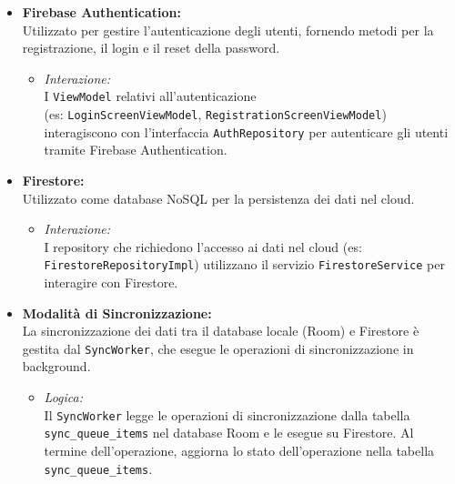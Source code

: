 \documentclass{article}
\begin{document}
\begin{itemize}
  \item \textbf{Firebase Authentication:}\\
    Utilizzato per gestire l'autenticazione degli utenti, fornendo metodi per la
    registrazione, il login e il reset della password.
    \begin{itemize}
      \item \textit{Interazione:}\\
        I \texttt{ViewModel} relativi all'autenticazione \\(es:
        \texttt{LoginScreenViewModel}, \texttt{RegistrationScreenViewModel})
        interagiscono con l'interfaccia \texttt{AuthRepository} per autenticare
        gli utenti tramite Firebase Authentication.
    \end{itemize}

  \item \textbf{Firestore:}\\
    Utilizzato come database NoSQL per la persistenza dei dati nel cloud.
    \begin{itemize}
      \item \textit{Interazione:}\\
        I repository che richiedono l’accesso ai dati nel cloud (es:
        \texttt{FirestoreRepositoryImpl}) utilizzano il servizio
        \texttt{FirestoreService} per interagire con Firestore.
    \end{itemize}

  \item \textbf{Modalità di Sincronizzazione:}\\
    La sincronizzazione dei dati tra il database locale (Room) e Firestore è
    gestita dal \texttt{SyncWorker}, che esegue le operazioni di
    sincronizzazione in background.
    \begin{itemize}
      \item \textit{Logica:}\\
        Il \texttt{SyncWorker} legge le operazioni di sincronizzazione dalla
        tabella \texttt{sync\_queue\_items} nel database Room e le esegue su
        Firestore.
        Al termine dell'operazione, aggiorna lo stato dell'operazione
        nella tabella \texttt{sync\_queue\_items}.
    \end{itemize}
\end{itemize}
\end{document}
